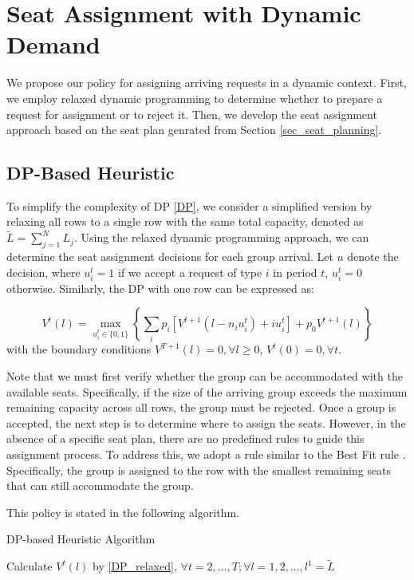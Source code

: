 \section{Seat Assignment with Dynamic Demand}\label{sec_dynamic}
We propose our policy for assigning arriving requests in a dynamic context. First, we employ relaxed dynamic programming to determine whether to prepare a request for assignment or to reject it. Then, we develop the seat assignment approach based on the seat plan genrated from Section \ref{sec_seat_planning}.


\subsection{DP-Based Heuristic}
To simplify the complexity of DP \eqref{DP}, we consider a simplified version by relaxing all rows to a single row with the same total capacity, denoted as $\tilde{L} = \sum_{j=1}^{N} L_j$.  Using the relaxed dynamic programming approach, we can determine the seat assignment decisions for each group arrival. Let $u$ denote the decision, where $u_{i}^{t} = 1$ if we accept a request of type $i$ in period $t$, $u_{i}^{t} =0$ otherwise. Similarly, the DP with one row can be expressed as:

\begin{equation}\label{DP_relaxed}
V^{t}(l) =  \max_{u_{i}^{t} \in \{0,1\}} \left\{ \sum_{i} p_i [V^{t+1}(l-n_i u_{i}^{t})+ i u_{i}^{t}] + p_0 V^{t+1}(l)\right\}
\end{equation}
with the boundary conditions $V^{T+1}(l) =0, \forall l \geq 0$, $V^{t}(0) =0, \forall t$.


Note that we must first verify whether the group can be accommodated with the available seats. Specifically, if the size of the arriving group exceeds the maximum remaining capacity across all rows, the group must be rejected. Once a group is accepted, the next step is to determine where to assign the seats. However, in the absence of a specific seat plan, there are no predefined rules to guide this assignment process. To address this, we adopt a rule similar to the Best Fit rule \citep{johnson1974fast}. Specifically, the group is assigned to the row with the smallest remaining seats that can still accommodate the group.

This policy is stated in the following algorithm.

\begin{algorithm}[H]
  \caption{DP-based Heuristic Algorithm}\label{algo_dp_heuris}
  Calculate $V^{t}(l)$ by \eqref{DP_relaxed}, $\forall t =2, \ldots, T; \forall l = 1, 2, \ldots, l^{1}=\tilde{L}$\;
\end{algorithm}


